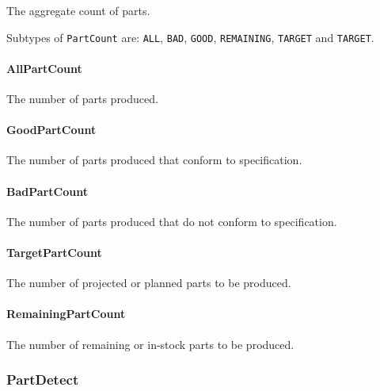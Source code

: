 The aggregate count of parts.


Subtypes of \texttt{PartCount} are: \texttt{ALL}, \texttt{BAD}, \texttt{GOOD}, \texttt{REMAINING}, \texttt{TARGET} and \texttt{TARGET}. 
\FloatBarrier

\paragraph{AllPartCount}\mbox{}
\label{sec:AllPartCount}



The number of parts produced. 


\paragraph{GoodPartCount}\mbox{}
\label{sec:GoodPartCount}



The number of parts produced that conform to specification.



\paragraph{BadPartCount}\mbox{}
\label{sec:BadPartCount}



The number of parts produced that do not conform to specification.


\paragraph{TargetPartCount}\mbox{}
\label{sec:TargetPartCount}



The number of projected or planned parts to be produced.


\paragraph{RemainingPartCount}\mbox{}
\label{sec:RemainingPartCount}



The number of remaining or in-stock parts to be produced.


\subsubsection{PartDetect}
\label{sec:PartDetect}



